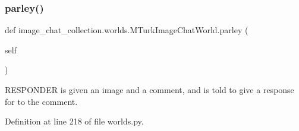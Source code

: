 \subsubsection{\texorpdfstring{parley()}{parley()}}
{\footnotesize\ttfamily def image\+\_\+chat\+\_\+collection.\+worlds.\+M\+Turk\+Image\+Chat\+World.\+parley (\begin{DoxyParamCaption}\item[{}]{self }\end{DoxyParamCaption})}

\begin{DoxyVerb}RESPONDER is given an image and a comment, and is told to give a response for to
the comment.
\end{DoxyVerb}
 

Definition at line 218 of file worlds.\+py.


